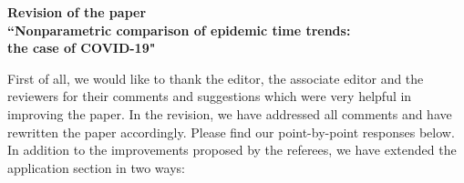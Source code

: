 \documentclass[a4paper,12pt]{article}
\begin{document}
\begin{center} 
{\large \bf Revision of the paper} \\[0.1cm]
{\large \bf ``Nonparametric comparison of epidemic time trends:} \\[0.1cm]
{\large \bf the case of COVID-19"} 
\end{center}
\vspace{7pt}



First of all, we would like to thank the editor, the associate editor and the reviewers for their comments and suggestions which were very helpful in improving the paper. In the revision, we have addressed all comments and have rewritten the paper accordingly. Please find our point-by-point responses below. %
In addition to the improvements proposed by the referees, we have extended the application section in two ways: 
\end{document}

